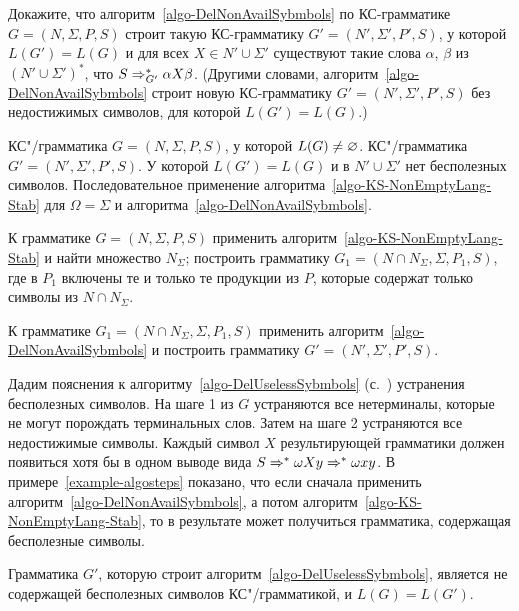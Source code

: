 \begin{myproblem}
\label{problem-eqOfLangsWithoutUselessSymbols}
Докажите, что алгоритм~\ref{algo-DelNonAvailSybmbols} по КС-грамматике $G=(N,\Sigma,P,S)$ строит такую КС-грамматику $G'=(N' ,\Sigma',P',S)$, у которой $L(G')=L(G)$ и для всех $X\in N'\cup\Sigma'$ существуют такие слова $\alpha$, $\beta$ из $(N'\cup\Sigma')^*$, что $S\Rightarrow_{G'}^*\alpha X\beta$. (Другими словами, алгоритм~\ref{algo-DelNonAvailSybmbols} строит новую КС-грамматику $G'=(N',\Sigma',P',S)$ без недостижимых символов, для которой $L(G')=L(G)$.)
\end{myproblem}

{\label{algo-DelUselessSybmbols}КС"/грамматика $G=(N,\Sigma,P,S)$, у которой $L(G)\neq\varnothing$.}
{КС"/грамматика $G'=(N',\Sigma',P',S)$. У которой $L(G')=L(G)$ и в $N'\cup\Sigma'$ нет бесполезных символов.}
{Последовательное применение алгоритма~\ref{algo-KS-NonEmptyLang-Stab} для $\Omega=\Sigma$ и алгоритма~\ref{algo-DelNonAvailSybmbols}.}
{
\item К грамматике $G=(N,\Sigma,P,S)$ применить алгоритм~\ref{algo-KS-NonEmptyLang-Stab} и найти множество $N_\Sigma$; построить грамматику $G_1=(N\cap N_\Sigma,\Sigma,P_1,S)$, где в $P_1$ включены те и только те продукции из $P$, которые содержат только символы из $N\cap N_\Sigma$.

\item К грамматике $G_1=(N\cap N_\Sigma,\Sigma,P_1,S)$ применить алгоритм~\ref{algo-DelNonAvailSybmbols} и построить грамматику $G'=(N',\Sigma',P',S)$.
}

Дадим пояснения к алгоритму~\ref{algo-DelUselessSybmbols} (с.~\pageref{algo-DelUselessSybmbols}) устранения бесполезных символов. На шаге 1 из $G$ устраняются все нетерминалы, которые не могут порождать терминальных слов. Затем на шаге 2 устраняются все недостижимые символы. Каждый символ $X$ результирующей грамматики должен появиться хотя бы в одном выводе вида $S\Rightarrow^*\omega Xy\Rightarrow^*\omega xy$. В примере~\ref{example-algosteps} показано, что если сначала применить алгоритм~\ref{algo-DelNonAvailSybmbols}, а потом алгоритм~\ref{algo-KS-NonEmptyLang-Stab}, то в результате может получиться грамматика, содержащая бесполезные символы.

\begin{mytheorem}
\label{theorem-AlgoDelUselessSymbolsCorrectness}
Грамматика $G'$, которую строит алгоритм~\ref{algo-DelUselessSybmbols}, является не содержащей бесполезных символов КС"/грамматикой, и $L(G)=L(G')$.
\end{mytheorem}

